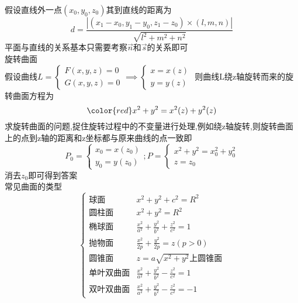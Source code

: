 \documentclass[12pt, a4paper, oneside, UTF8]{ctexbook}
\begin{document}
\begin{tcolorbox}[title=曲面与曲线]
    假设直线外一点$(x_0,y_0,z_0)$其到直线的距离为
    $$
    d = \frac{\left|(x_1-x_0,y_1-y_0,z_1-z_0)\times(l,m,n)\right|}{\sqrt{l^2+m^2+n^2}}
    $$
    平面与直线的关系基本只需要考察$\vec{n}$和$\vec{s}$的关系即可 \\
    旋转曲面 \\
    假设曲线$L=\begin{cases}
        F(x,y,z) = 0 \\
        G(x,y,z) = 0
    \end{cases}\implies \begin{cases}
        x = x(z) \\
        y = y(z)
    \end{cases}$ 则曲线L绕z轴旋转而来的旋转曲面方程为 
    $$
    {\color{red}x^2 + y ^2 = x^2(z) + y ^2(z)}
    $$
    求旋转曲面的问题,捉住旋转过程中的不变量进行处理,例如绕z轴旋转,则旋转曲面上的点到z轴的距离和z坐标都与原来曲线的点一致即
    $$
    P_0=\begin{cases}
        x_0=x(z_0) \\
        y_0=y(z_0)
    \end{cases}; P=\begin{cases}
        x^2+y^2=x^2_0+y^2_0 \\
        z = z_0
    \end{cases}
    $$ 消去$z_0$即可得到答案 \\
常见曲面的类型 
$$
\begin{cases}
    \text{球面}&x^2+y^2+c^2=R^2 \\
    \text{圆柱面} &x^2+y^2 = R^2 \\
    \text{椭球面} &\frac{x^2}{a^2}+\frac{y^2}{b^2}+\frac{z^2}{c^2} = 1 \\
    \text{抛物面} &\frac{x^2}{2p}+\frac{y^2}{2p} = z (p > 0) \\
    \text{圆锥面} &z=a\sqrt{x^2+y^2}\text{上圆锥面} \\
    \text{单叶双曲面} &\frac{x^2}{a^2}+\frac{y^2}{b^2}-\frac{z^2}{c^2} = 1 \\
    \text{双叶双曲面} &\frac{x^2}{a^2}+\frac{y^2}{b^2}-\frac{z^2}{c^2} = -1
\end{cases}
$$
\end{tcolorbox}
\end{document}
